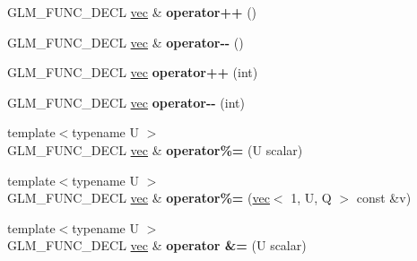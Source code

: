 \begin{DoxyCompactItemize}
G\+L\+M\+\_\+\+F\+U\+N\+C\+\_\+\+D\+E\+CL \hyperlink{structglm_1_1vec}{vec} \& {\bfseries operator++} ()
\item 
\mbox{\label{structglm_1_1vec_3_011_00_01T_00_01Q_01_4_aeae2b05422c154000e72b90a08afdd13}} 
G\+L\+M\+\_\+\+F\+U\+N\+C\+\_\+\+D\+E\+CL \hyperlink{structglm_1_1vec}{vec} \& {\bfseries operator-\/-\/} ()
\item 
\mbox{\label{structglm_1_1vec_3_011_00_01T_00_01Q_01_4_aa829fdf00e136856718ce8c37b43d507}} 
G\+L\+M\+\_\+\+F\+U\+N\+C\+\_\+\+D\+E\+CL \hyperlink{structglm_1_1vec}{vec} {\bfseries operator++} (int)
\item 
\mbox{\label{structglm_1_1vec_3_011_00_01T_00_01Q_01_4_a5a8b3c0ef842a37c2ac49e9828231e6f}} 
G\+L\+M\+\_\+\+F\+U\+N\+C\+\_\+\+D\+E\+CL \hyperlink{structglm_1_1vec}{vec} {\bfseries operator-\/-\/} (int)
\item 
\mbox{\label{structglm_1_1vec_3_011_00_01T_00_01Q_01_4_adfee0c8240cd43f82360a4a1910015f6}} 
{\footnotesize template$<$typename U $>$ }\\G\+L\+M\+\_\+\+F\+U\+N\+C\+\_\+\+D\+E\+CL \hyperlink{structglm_1_1vec}{vec} \& {\bfseries operator\%=} (U scalar)
\item 
\mbox{\label{structglm_1_1vec_3_011_00_01T_00_01Q_01_4_a9eb9bdb0ae02f791df5f5f5e50106a37}} 
{\footnotesize template$<$typename U $>$ }\\G\+L\+M\+\_\+\+F\+U\+N\+C\+\_\+\+D\+E\+CL \hyperlink{structglm_1_1vec}{vec} \& {\bfseries operator\%=} (\hyperlink{structglm_1_1vec}{vec}$<$ 1, U, Q $>$ const \&v)
\item 
\mbox{\label{structglm_1_1vec_3_011_00_01T_00_01Q_01_4_a706c89cad56f524dcb0f28ffd4331e47}} 
{\footnotesize template$<$typename U $>$ }\\G\+L\+M\+\_\+\+F\+U\+N\+C\+\_\+\+D\+E\+CL \hyperlink{structglm_1_1vec}{vec} \& {\bfseries operator \&=} (U scalar)
\item 
\mbox{\label{structglm_1_1vec_3_011_00_01T_00_01Q_01_4_a8c0b58226b01a0755fa54aab4ccfe274}} 

\end{DoxyCompactItemize}
